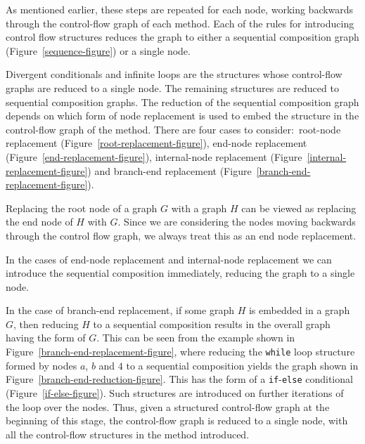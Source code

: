 As mentioned earlier, these steps are repeated for each node, working
backwards through the control-flow graph of each method.
Each of the rules for introducing control flow structures reduces the
graph to either a sequential composition graph
(Figure~\ref{sequence-figure}) or a single node.

Divergent conditionals and infinite loops are the structures whose
control-flow graphs are reduced to a single node.
The remaining structures are reduced to sequential composition graphs.
The reduction of the sequential composition graph depends on which
form of node replacement is used to embed the structure in the
control-flow graph of the method.
There are four cases to consider:~root-node replacement
(Figure~\ref{root-replacement-figure}), end-node replacement
(Figure~\ref{end-replacement-figure}), internal-node replacement
(Figure~\ref{internal-replacement-figure}) and branch-end replacement
(Figure~\ref{branch-end-replacement-figure}).

Replacing the root node of a graph $G$ with a graph $H$ can be viewed
as replacing the end node of $H$ with $G$.
Since we are considering the nodes moving backwards through the
control flow graph, we always treat this as an end node replacement.

In the cases of end-node replacement and internal-node replacement we
can introduce the sequential composition immediately, reducing the
graph to a single node.

In the case of branch-end replacement, if some graph $H$ is embedded
in a graph $G$, then reducing $H$ to a sequential composition results
in the overall graph having the form of $G$.
This can be seen from the example shown in
Figure~\ref{branch-end-replacement-figure}, where reducing the
\texttt{while} loop structure formed by nodes $a$, $b$ and $4$ to a
sequential composition yields the graph shown in
Figure~\ref{branch-end-reduction-figure}.
This has the form of a \texttt{if}-\texttt{else} conditional
(Figure~\ref{if-else-figure}).
Such structures are introduced on further iterations of the loop over
the nodes.
Thus, given a structured control-flow graph at the beginning of this
stage, the control-flow graph is reduced to a single node, with all
the control-flow structures in the method introduced.


